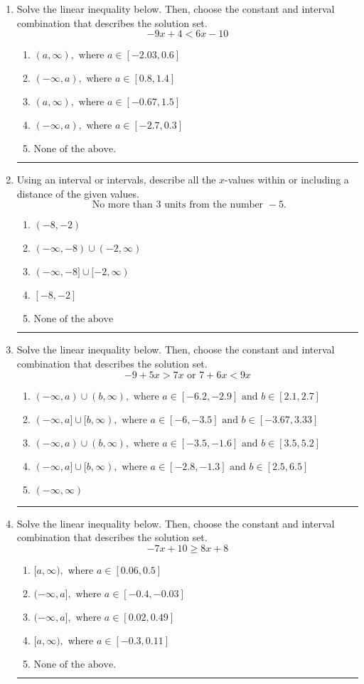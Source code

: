 \documentclass[14pt]{extbook}
\newcommand{\litem}[1]{\item#1\hspace*{-1cm}\rule{\textwidth}{0.4pt}}
\begin{document}
\begin{enumerate}
\litem{
Solve the linear inequality below. Then, choose the constant and interval combination that describes the solution set.\[ -9x + 4 < 6x -10 \]\begin{enumerate}[label=\Alph*.]
\item \( (a, \infty), \text{ where } a \in [-2.03, 0.6] \)
\item \( (-\infty, a), \text{ where } a \in [0.8, 1.4] \)
\item \( (a, \infty), \text{ where } a \in [-0.67, 1.5] \)
\item \( (-\infty, a), \text{ where } a \in [-2.7, 0.3] \)
\item \( \text{None of the above}. \)

\end{enumerate} }
\litem{
Using an interval or intervals, describe all the $x$-values within or including a distance of the given values.\[ \text{ No more than } 3 \text{ units from the number } -5. \]\begin{enumerate}[label=\Alph*.]
\item \( (-8, -2) \)
\item \( (-\infty, -8) \cup (-2, \infty) \)
\item \( (-\infty, -8] \cup [-2, \infty) \)
\item \( [-8, -2] \)
\item \( \text{None of the above} \)

\end{enumerate} }
\litem{
Solve the linear inequality below. Then, choose the constant and interval combination that describes the solution set.\[ -9 + 5 x > 7 x \text{ or } 7 + 6 x < 9 x \]\begin{enumerate}[label=\Alph*.]
\item \( (-\infty, a) \cup (b, \infty), \text{ where } a \in [-6.2, -2.9] \text{ and } b \in [2.1, 2.7] \)
\item \( (-\infty, a] \cup [b, \infty), \text{ where } a \in [-6, -3.5] \text{ and } b \in [-3.67, 3.33] \)
\item \( (-\infty, a) \cup (b, \infty), \text{ where } a \in [-3.5, -1.6] \text{ and } b \in [3.5, 5.2] \)
\item \( (-\infty, a] \cup [b, \infty), \text{ where } a \in [-2.8, -1.3] \text{ and } b \in [2.5, 6.5] \)
\item \( (-\infty, \infty) \)

\end{enumerate} }
\litem{
Solve the linear inequality below. Then, choose the constant and interval combination that describes the solution set.\[ -7x + 10 \geq 8x + 8 \]\begin{enumerate}[label=\Alph*.]
\item \( [a, \infty), \text{ where } a \in [0.06, 0.5] \)
\item \( (-\infty, a], \text{ where } a \in [-0.4, -0.03] \)
\item \( (-\infty, a], \text{ where } a \in [0.02, 0.49] \)
\item \( [a, \infty), \text{ where } a \in [-0.3, 0.11] \)
\item \( \text{None of the above}. \)


\end{enumerate}}
\end{enumerate}
\end{document}
